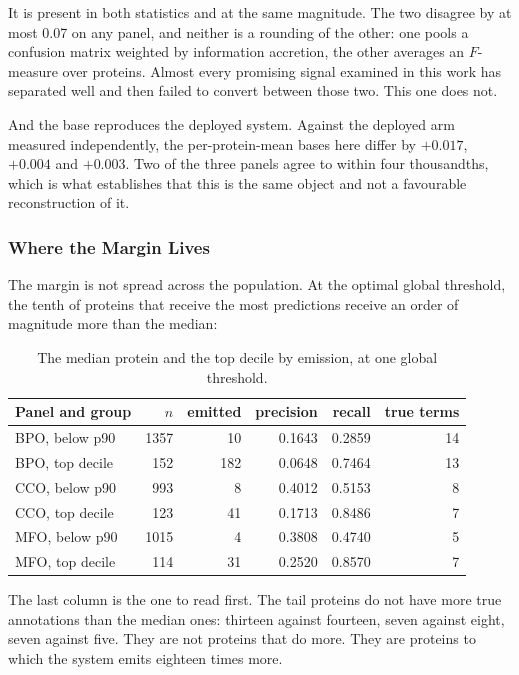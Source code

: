 It is present in both statistics and at the same magnitude. The two disagree by
at most 0.07 on any panel, and neither is a rounding of the other: one pools a
confusion matrix weighted by information accretion, the other averages an
$F$-measure over proteins. Almost every promising signal examined in this work
has separated well and then failed to convert between those two. This one does
not.

And the base reproduces the deployed system. Against the deployed arm measured
independently, the per-protein-mean bases here differ by $+0.017$, $+0.004$ and
$+0.003$. Two of the three panels agree to within four thousandths, which is
what establishes that this is the same object and not a favourable
reconstruction of it.

\subsubsection{Where the Margin Lives}

The margin is not spread across the population. At the optimal global
threshold, the tenth of proteins that receive the most predictions receive an
order of magnitude more than the median:

\begin{table}[htbp]
\centering
\caption{The median protein and the top decile by emission, at one global
threshold.}
\label{tab:exp17-tail}
\begin{tabular}{lrrrrr}
\toprule
Panel and group & $n$ & emitted & precision & recall & true terms \\
\midrule
BPO, below p90 & 1357 & 10 & 0.1643 & 0.2859 & 14 \\
BPO, top decile & 152 & 182 & 0.0648 & 0.7464 & 13 \\
CCO, below p90 & 993 & 8 & 0.4012 & 0.5153 & 8 \\
CCO, top decile & 123 & 41 & 0.1713 & 0.8486 & 7 \\
MFO, below p90 & 1015 & 4 & 0.3808 & 0.4740 & 5 \\
MFO, top decile & 114 & 31 & 0.2520 & 0.8570 & 7 \\
\bottomrule
\end{tabular}
\end{table}

The last column is the one to read first. The tail proteins do not have more
true annotations than the median ones: thirteen against fourteen, seven against
eight, seven against five. They are not proteins that do more. They are
proteins to which the system emits eighteen times more.

